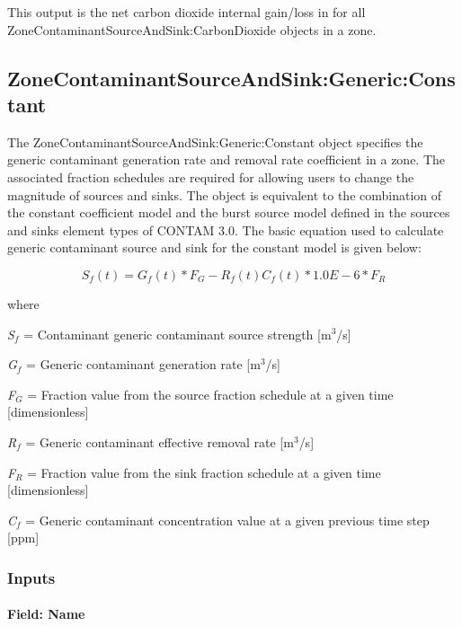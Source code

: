 This output is the net carbon dioxide internal gain/loss in \si{\volumeFlowRate} for all ZoneContaminantSourceAndSink:CarbonDioxide objects in a zone.

\subsection{ZoneContaminantSourceAndSink:Generic:Constant}\label{zonecontaminantsourceandsinkgenericconstant}

The ZoneContaminantSourceAndSink:Generic:Constant object specifies the generic contaminant generation rate and removal rate coefficient in a zone. The associated fraction schedules are required for allowing users to change the magnitude of sources and sinks. The object is equivalent to the combination of the constant coefficient model and the burst source model defined in the sources and sinks element types of CONTAM 3.0. The basic equation used to calculate generic contaminant source and sink for the constant model is given below:

\begin{equation}
{S_f}(t) = {G_f}(t)*{F_G} - {R_f}(t){C_f}(t)*1.0E - 6*{F_R}
\end{equation}

where

\emph{S\(_{f}\)} = Contaminant generic contaminant source strength {[}m\(^{3}\)/s{]}

\emph{G\(_{f}\)} = Generic contaminant generation rate {[}m\(^{3}\)/s{]}

\emph{F\(_{G}\)} = Fraction value from the source fraction schedule at a given time {[}dimensionless{]}

\emph{R\(_{f}\)} = Generic contaminant effective removal rate {[}m\(^{3}\)/s{]}

\emph{F\(_{R}\)} = Fraction value from the sink fraction schedule at a given time {[}dimensionless{]}

\emph{C\(_{f}\)} = Generic contaminant concentration value at a given previous time step {[}ppm{]}

\subsubsection{Inputs}\label{inputs-11-007}

\paragraph{Field: Name}\label{field-name-11-006}

